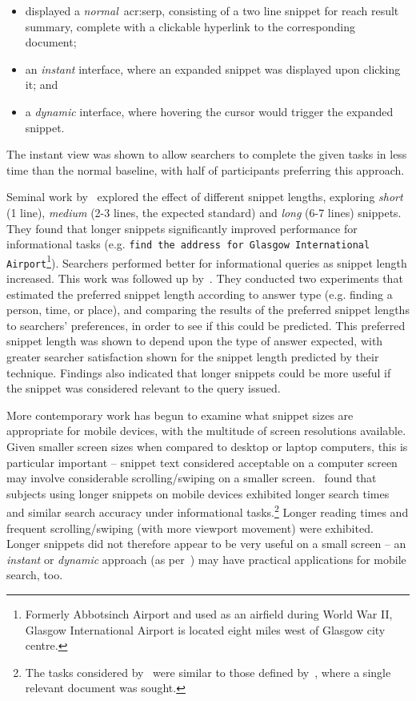 \begin{itemize}
    \item{displayed a \emph{normal}~\gls{acr:serp}, consisting of a two line snippet for reach result summary, complete with a clickable hyperlink to the corresponding document;}
    \item{an \emph{instant} interface, where an expanded snippet was displayed upon clicking it; and}
    \item{a \emph{dynamic} interface, where hovering the cursor would trigger the expanded snippet.}
\end{itemize}

The instant view was shown to allow searchers to complete the given tasks in less time than the normal baseline, with half of participants preferring this approach.

Seminal work by~\cite{cutrell2007eye_tracking} explored the effect of different snippet lengths, exploring \emph{short} (1 line), \emph{medium} (2-3 lines, the expected standard) and \emph{long} (6-7 lines) snippets. They found that longer snippets significantly improved performance for informational tasks (e.g. \texttt{find the address for Glasgow International Airport}\footnote{Formerly Abbotsinch Airport and used as an airfield during World War II, Glasgow International Airport is located eight miles west of Glasgow city centre.}). Searchers performed better for informational queries as snippet length increased. This work was followed up by~\cite{kaisser2008improving}. They conducted two experiments that estimated the preferred snippet length according to answer type (e.g. finding a person, time, or place), and comparing the results of the preferred snippet lengths to searchers' preferences, in order to see if this could be predicted. This preferred snippet length was shown to depend upon the type of answer expected, with greater searcher satisfaction shown for the snippet length predicted by their technique. Findings also indicated that longer snippets could be more useful if the snippet was considered relevant to the query issued.

More contemporary work has begun to examine what snippet sizes are appropriate for mobile devices, with the multitude of screen resolutions available. Given smaller screen sizes when compared to desktop or laptop computers, this is particular important -- snippet text considered acceptable on a computer screen may involve considerable scrolling/swiping on a smaller screen.~\cite{kim2017mobile_search_snippets} found that subjects using longer snippets on mobile devices exhibited longer search times and similar search accuracy under informational tasks.\footnote{The tasks considered by~\cite{kim2017mobile_search_snippets} were similar to those defined by~\cite{cutrell2007eye_tracking}, where a single relevant document was sought.} Longer reading times and frequent scrolling/swiping (with more viewport movement) were exhibited. Longer snippets did not therefore appear to be very useful on a small screen -- an \emph{instant} or \emph{dynamic} approach (as per~\cite{paek2004wavelens}) may have practical applications for mobile search, too.

